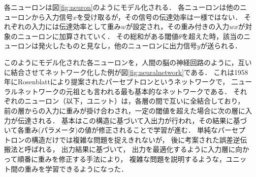 \begin{figure}[t]
\begin{center}
\hspace*{-40pt}
\end{center}
\end{figure}


各ニューロンは図\ref{fig:neuron}のようにモデル化される．
各ニューロンは他のニューロンから入力信号$x$を受け取るが，その信号の伝達効率は一様ではない．
それぞれの入力には伝達効率として重み$w$が設定され，その重み付きの入力$w x$が対象のニューロンに加算されていく．
その総和がある閾値$\theta$を超えた時，該当のニューロンは発火したものと見なし，他のニューロンに出力信号$y$が送られる．



このようにモデル化された各ニューロンを，人間の脳の神経回路のように，互いに結合させてネットワーク化した例が図\ref{fig:neuralnetwork}である．
これは1958年にRosenblattにより提案されたパーセプトロンというネットワークで，
二ューラルネットワークの元祖とも言われる最も基本的なネットワークである\cite{rosenblatt1958perceptron}．
それぞれのニューロン（以下，ユニット）は，各層の間で互いに全結合しており，
前の層からの入力に重みが掛け合わされ，一定の閾値を超えた場合に次の層に入力が伝達される．
基本はこの構造に基づいて入出力が行われ，その結果に基づいて各重み(パラメータ)の値が修正されることで学習が進む．
単純なパーセプトロンの構造だけでは複雑な問題を捉えきれないが，
後に考案された誤差逆伝搬法\cite{rumelhart1988learning}と呼ばれる，
出力結果に基づいて，
出力を最適化するように入力層に向かって順番に重みを修正する手法により，
複雑な問題を説明するような，ユニット間の重みを学習できるようになった．


